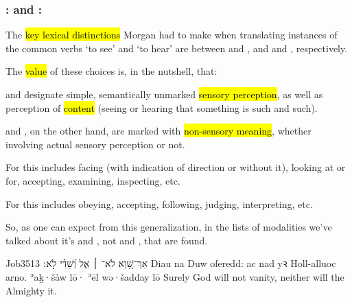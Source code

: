 \subsubsection{: and :}

\begin{paper}
	{\click} The \hl{key lexical distinctions} Morgan had to make when translating instances of the common verbs  ‘to see’ and  ‘to hear’ are between  and , and  and , respectively.

	{\click} The \hl{value} of these choices is, in the nutshell, that:
	\begin{compactitem}
		\item {} and  designate simple, semantically unmarked \hl{sensory perception}, as well as perception of \hl{content} (seeing or hearing that something is such and such).
		\item {} and , on the other hand, are marked with \hl{non-sensory meaning}, whether involving actual sensory perception or not.
			\begin{compactitem}
				\item For  this includes facing (with indication of direction or without it), looking at or for, accepting, examining, inspecting, etc.
				\item For  this includes obeying, accepting, following, judging, interpreting, etc.
			\end{compactitem}
	\end{compactitem}

	So, as one can expect from this generalization, in the lists of modalities we’ve talked about it’s  and , not  and , that are found.
\end{paper}



\begin{example}{Job}{35}{13}{}{}
	\quoling
	{אַךְ־שָׁ֭וְא לֹא־ ׀ אֵ֑ל וְ֝שַׁדַּ֗י לֹ֣א ׃}
	{Diau na  Duw oferedd: ac nad  yꝛ Holl-alluoc arno.}
	{ʾaḵ·šåw lō· ʾēl wə·šadday lō }
	{Surely God will not  vanity, neither will the Almighty  it.}
\end{example}

